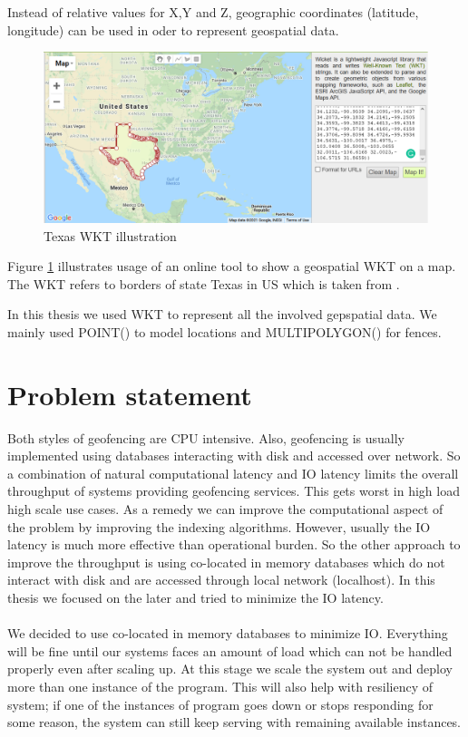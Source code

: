 \documentclass[a4]{report}
\begin{document}
        Instead of relative values for X,Y and Z, geographic coordinates (latitude, longitude) can be used in oder to
        represent geospatial data.

        \begin{figure}[ht]
            \caption{Texas WKT illustration}
            \label{fig:texas}
            \includegraphics[scale=0.4]{images/texas.png}
        \end{figure}
        Figure \ref{fig:texas} illustrates usage of an online tool \cite{WKTtool} to show a geospatial WKT on a map.
        The WKT refers to borders of state Texas in US which is taken from \cite{WKTs}.

        In this thesis we used WKT to represent all the involved gepspatial data.
        We mainly used POINT() to model locations and MULTIPOLYGON() for fences.

        \section{Problem statement}
        Both styles of geofencing are CPU intensive.
        Also, geofencing is usually implemented using databases interacting with disk and accessed over network.
        So a combination of natural computational latency and IO latency limits the overall throughput of systems
        providing geofencing services.
        This gets worst in high load high scale use cases.
        As a remedy we can improve the computational aspect of the problem by improving the indexing algorithms.
        However, usually the IO latency is much more effective than operational burden.
        So the other approach to improve the throughput is using co-located in memory databases  which do not interact
        with disk and are accessed through local network (localhost).
        In this thesis we focused on the later and tried to minimize the IO latency.

        \paragraph{}
        We decided to use co-located in memory databases to minimize IO.
        Everything will be fine until our systems faces an amount of load which can not be handled properly even after scaling up.
        At this stage we scale the system out and deploy more than one instance of the program.
        This will also help with resiliency of system;
        if one of the instances of program goes down or stops responding for some reason, the system can still keep
        serving with remaining available instances.
\end{document}
